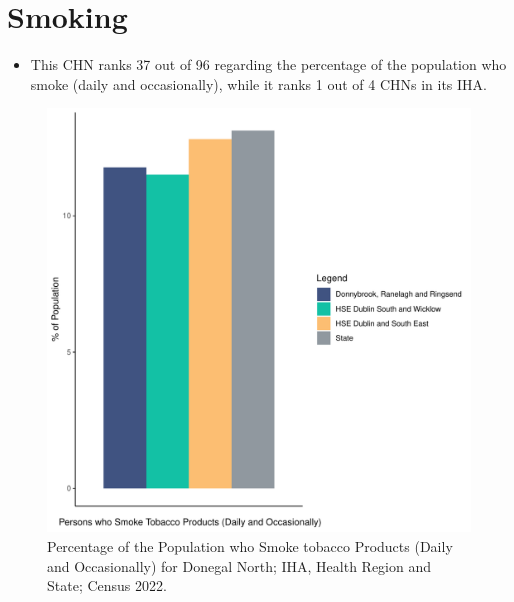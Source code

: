 \documentclass{article}
\begin{document}
\pagebreak

\section{Smoking}\label{sect:Smoking}
\begin{itemize}
\item This CHN ranks  37 out of 96 regarding the percentage of the population who smoke (daily and occasionally), while it ranks   1 out of 4 CHNs in its IHA.
\end{itemize}
\begin{figure}[H]
	\centering
	\includegraphics[width = 120mm]{../figures/SmokingED.pdf}
	\caption{Percentage of the Population who Smoke tobacco Products (Daily and Occasionally) for Donegal North; IHA, Health Region and State; Census 2022.}
	\label{fig:2ae19629-1a6a-13a3-e055-000000000001}
	\end{figure}
	
\end{document}
